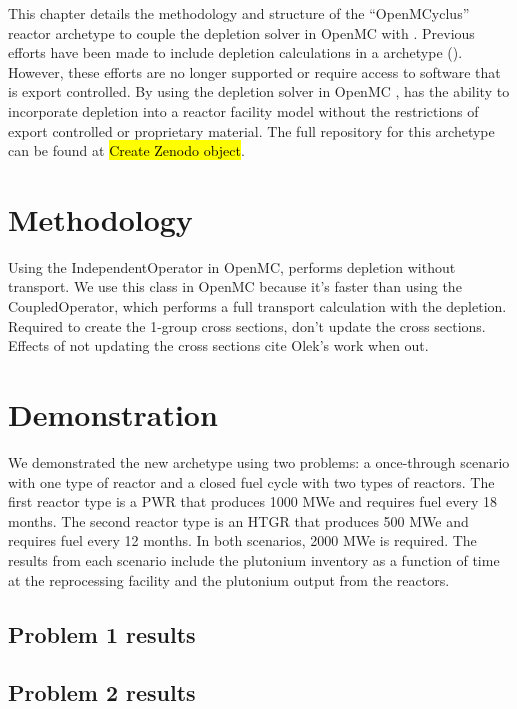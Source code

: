 This chapter details the methodology and structure of the ``OpenMCyclus'' 
reactor archetype to couple the depletion solver in OpenMC with 
\Cyclus. Previous efforts have been made to include depletion calculations 
in a \Cyclus archetype (\cite{skutnik_cyborg_2016}). However, these efforts 
are no longer supported or require access to software that is export controlled. 
By using the depletion solver in OpenMC \cite{romano_depletion_2021}, \Cyclus 
has the ability to incorporate depletion into a reactor facility model without 
the restrictions of export controlled or proprietary material. The full 
repository for this archetype can be found at \hl{Create Zenodo object}.

\section{Methodology}

Using the IndependentOperator in OpenMC, performs depletion without transport. 
We use this class in 
OpenMC because it's faster than using the CoupledOperator, which performs a full 
transport calculation with the depletion. Required to create the 1-group cross 
sections, don't update the cross sections. Effects of not updating the cross 
sections cite Olek's work when out. 

\section{Demonstration}
We demonstrated the new archetype using two problems: a once-through scenario with one 
type of reactor and a closed fuel cycle with two types of reactors. The first 
reactor type is a \gls{PWR} that produces 1000 MWe and requires fuel every 
18 months. The second reactor type is an \gls{HTGR} that produces 500 MWe and requires 
fuel every 12 months. In both scenarios, 2000 MWe is required. The results from each 
scenario include the plutonium inventory as a function of time at the reprocessing 
facility and the plutonium output from the reactors. 

\subsection{Problem 1 results}

\subsection{Problem 2 results}